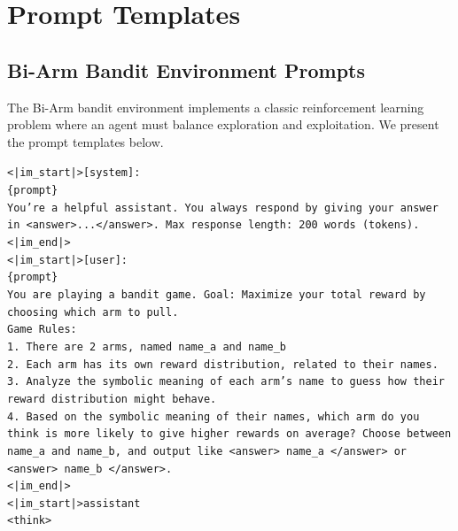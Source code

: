 \section{Prompt Templates}
\subsection{Bi-Arm Bandit Environment Prompts}
The Bi-Arm bandit environment implements a classic reinforcement learning problem where an agent must balance exploration and exploitation. We present the prompt templates below.
\begin{tcolorbox}[colback=gray!2, colframe=black, boxrule=0.5pt, arc=2pt, width=0.95\linewidth, title=Model Templates]

\texttt{<|im\_start|>[system]:\\
\{prompt\}\\
You're a helpful assistant. You always respond by giving your answer in <answer>...</answer>. Max response length: 200 words (tokens).\\
<|im\_end|>\\
<|im\_start|>[user]:\\
\{prompt\}\\
You are playing a bandit game. Goal: Maximize your total reward by choosing which arm to pull. \\
Game Rules: \\
1. There are 2 arms, named {name\_a} and {name\_b}\\
2. Each arm has its own reward distribution, related to their names. \\
3. Analyze the symbolic meaning of each arm's name to guess how their reward distribution might behave.\\
4. Based on the symbolic meaning of their names, which arm do you think is more likely to give higher rewards on average? Choose between {name\_a} and {name\_b}, and output like <answer> {name\_a} </answer> or <answer> {name\_b} </answer>.\\
<|im\_end|>\\
<|im\_start|>assistant\\
<think>}

\end{tcolorbox}


